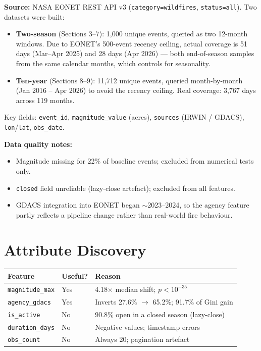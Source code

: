 \documentclass[12pt, letterpaper]{article}
\begin{document}
\textbf{Source:} NASA EONET REST API v3 (\texttt{category=wildfires},
\texttt{status=all}). Two datasets were built:

\begin{itemize}
  \item \textbf{Two-season} (Sections 3--7): 1,000 unique events,
        queried as two 12-month windows. Due to EONET's 500-event
        recency ceiling, actual coverage is 51 days (Mar--Apr 2025)
        and 28 days (Apr 2026) --- both end-of-season samples from
        the same calendar months, which controls for seasonality.
  \item \textbf{Ten-year} (Sections 8--9): 11,712 unique events,
        queried month-by-month (Jan 2016 -- Apr 2026) to avoid the
        recency ceiling. Real coverage: 3,767 days across 119 months.
\end{itemize}

\noindent Key fields: \texttt{event\_id}, \texttt{magnitude\_value} (acres),
\texttt{sources} (IRWIN / GDACS), \texttt{lon}/\texttt{lat}, \texttt{obs\_date}.

\noindent\textbf{Data quality notes:}
\begin{itemize}
  \item Magnitude missing for 22\% of baseline events; excluded from
        numerical tests only.
  \item \texttt{closed} field unreliable (lazy-close artefact); excluded
        from all features.
  \item GDACS integration into EONET began $\sim$2023--2024, so the agency
        feature partly reflects a pipeline change rather than real-world
        fire behaviour.
\end{itemize}

\section{Attribute Discovery}

\begin{center}
\begin{tabular}{llp{5.5cm}}
\toprule
\textbf{Feature} & \textbf{Useful?} & \textbf{Reason} \\
\midrule
\texttt{magnitude\_max}  & Yes & 4.18$\times$ median shift; $p < 10^{-35}$ \\
\texttt{agency\_gdacs}   & Yes & Inverts 27.6\% $\to$ 65.2\%;
                                  91.7\% of Gini gain \\
\texttt{is\_active}      & No  & 90.8\% open in a closed season (lazy-close) \\
\texttt{duration\_days}  & No  & Negative values; timestamp errors \\
\texttt{obs\_count}      & No  & Always 20; pagination artefact \\
\bottomrule
\end{tabular}
\end{center}
\end{document}
